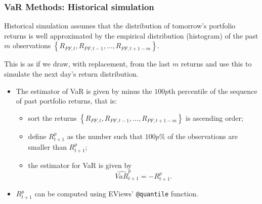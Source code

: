 \begin{frame}%

\frametitle{VaR Methods: Historical simulation}

Historical simulation assumes that the distribution of tomorrow's portfolio
returns is well approximated by the empirical distribution (histogram) of
the past $m$ observations $\left\{
R_{PF,t},R_{PF,t-1},\ldots,R_{PF,t+1-m}\right\} $.

This is as if we draw, with replacement, from the last $m$ returns and use
this to simulate the next day's return distribution.

\begin{itemize}
\item The estimator of VaR is given by minus the $100p$th percentile of the
sequence of past portfolio returns, that is:

\begin{itemize}
\item sort the returns $\left\{ R_{PF,t},R_{PF,t-1},...,R_{PF,t+1-m}\right\}$
is ascending order;

\item define $R_{t+1}^{p}$ as the number such that $100p\%$ of the
observations are smaller than $R_{t+1}^{p}$;

\item the estimator for VaR is given by
\begin{equation*}
\widehat{VaR}_{t+1}^{p}=-R_{t+1}^{p}.
\end{equation*}
\end{itemize}

\item $R_{t+1}^{p}$ can be computed using EViews' \texttt{@quantile}
function.
\end{itemize}

\end{frame}%

